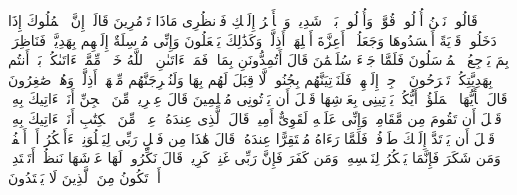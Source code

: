 \stopbuffer
\startbuffer[\q:27:33]
قَالُوا۟ نَحۡنُ أُو۟لُوا۟ قُوَّةࣲ وَأُو۟لُوا۟ بَأۡسࣲ شَدِیدࣲ وَٱلۡأَمۡرُ إِلَیۡكِ فَٱنظُرِی مَاذَا تَأۡمُرِینَ%
\stopbuffer
\startbuffer[\q:27:34]
قَالَتۡ إِنَّ ٱلۡمُلُوكَ إِذَا دَخَلُوا۟ قَرۡیَةً أَفۡسَدُوهَا وَجَعَلُوۤا۟ أَعِزَّةَ أَهۡلِهَاۤ أَذِلَّةࣰۚ وَكَذَٰلِكَ یَفۡعَلُونَ%
\stopbuffer
\startbuffer[\q:27:35]
وَإِنِّی مُرۡسِلَةٌ إِلَیۡهِم بِهَدِیَّةࣲ فَنَاظِرَةُۢ بِمَ یَرۡجِعُ ٱلۡمُرۡسَلُونَ%
\stopbuffer
\startbuffer[\q:27:36]
فَلَمَّا جَاۤءَ سُلَیۡمَٰنَ قَالَ أَتُمِدُّونَنِ بِمَالࣲ فَمَاۤ ءَاتَىٰنِۦَ ٱللَّهُ خَیۡرࣱ مِّمَّاۤ ءَاتَىٰكُمۚ بَلۡ أَنتُم بِهَدِیَّتِكُمۡ تَفۡرَحُونَ%
\stopbuffer
\startbuffer[\q:27:37]
ٱرۡجِعۡ إِلَیۡهِمۡ فَلَنَأۡتِیَنَّهُم بِجُنُودࣲ لَّا قِبَلَ لَهُم بِهَا وَلَنُخۡرِجَنَّهُم مِّنۡهَاۤ أَذِلَّةࣰ وَهُمۡ صَٰغِرُونَ%
\stopbuffer
\startbuffer[\q:27:38]
قَالَ یَٰۤأَیُّهَا ٱلۡمَلَؤُا۟ أَیُّكُمۡ یَأۡتِینِی بِعَرۡشِهَا قَبۡلَ أَن یَأۡتُونِی مُسۡلِمِینَ%
\stopbuffer
\startbuffer[\q:27:39]
قَالَ عِفۡرِیتࣱ مِّنَ ٱلۡجِنِّ أَنَا۠ ءَاتِیكَ بِهِۦ قَبۡلَ أَن تَقُومَ مِن مَّقَامِكَۖ وَإِنِّی عَلَیۡهِ لَقَوِیٌّ أَمِینࣱ%
\stopbuffer
\startbuffer[\q:27:40]
قَالَ ٱلَّذِی عِندَهُۥ عِلۡمࣱ مِّنَ ٱلۡكِتَٰبِ أَنَا۠ ءَاتِیكَ بِهِۦ قَبۡلَ أَن یَرۡتَدَّ إِلَیۡكَ طَرۡفُكَۚ فَلَمَّا رَءَاهُ مُسۡتَقِرًّا عِندَهُۥ قَالَ هَٰذَا مِن فَضۡلِ رَبِّی لِیَبۡلُوَنِیۤ ءَأَشۡكُرُ أَمۡ أَكۡفُرُۖ وَمَن شَكَرَ فَإِنَّمَا یَشۡكُرُ لِنَفۡسِهِۦۖ وَمَن كَفَرَ فَإِنَّ رَبِّی غَنِیࣱّ كَرِیمࣱ%
\stopbuffer
\startbuffer[\q:27:41]
قَالَ نَكِّرُوا۟ لَهَا عَرۡشَهَا نَنظُرۡ أَتَهۡتَدِیۤ أَمۡ تَكُونُ مِنَ ٱلَّذِینَ لَا یَهۡتَدُونَ%
\stopbuffer

